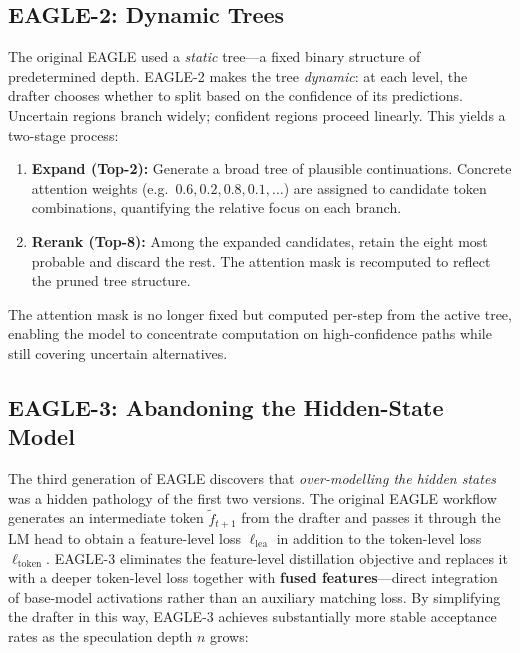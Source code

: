 \documentclass[11pt,a4paper]{article}
\theoremstyle{definition}
\theoremstyle{remark}
\theoremstyle{plain}
\begin{document}
\subsection{EAGLE-2: Dynamic Trees}

The original EAGLE used a \emph{static} tree---a fixed binary structure of
predetermined depth. EAGLE-2 makes the tree \emph{dynamic}: at each level,
the drafter chooses whether to split based on the confidence of its
predictions. Uncertain regions branch widely; confident regions proceed
linearly. This yields a two-stage process:

\begin{enumerate}[leftmargin=1.8em, itemsep=2pt]
  \item \textbf{Expand (Top-2):} Generate a broad tree of plausible
        continuations. Concrete attention weights (e.g.\
        $0.6, 0.2, 0.8, 0.1, \ldots$) are assigned to candidate token
        combinations, quantifying the relative focus on each branch.
  \item \textbf{Rerank (Top-8):} Among the expanded candidates, retain the
        eight most probable and discard the rest. The attention mask is
        recomputed to reflect the pruned tree structure.
\end{enumerate}

The attention mask is no longer fixed but computed per-step from the
active tree, enabling the model to concentrate computation on
high-confidence paths while still covering uncertain alternatives.

\subsection{EAGLE-3: Abandoning the Hidden-State Model}
\label{ssec:eagle3}

The third generation of EAGLE discovers that \emph{over-modelling the
hidden states} was a hidden pathology of the first two versions. The
original EAGLE workflow generates an intermediate token $\tilde{f}_{t+1}$
from the drafter and passes it through the LM head to obtain a
feature-level loss $\ell_{\mathrm{lea}}$ in addition to the token-level
loss $\ell_{\mathrm{token}}$. EAGLE-3 eliminates the feature-level
distillation objective and replaces it with a deeper token-level loss
together with \textbf{fused features}---direct integration of base-model
activations rather than an auxiliary matching loss. By simplifying the
drafter in this way, EAGLE-3 achieves substantially more stable acceptance
rates as the speculation depth $n$ grows:
\end{document}
